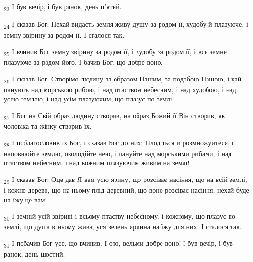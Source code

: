 \begin{tcolorbox}
\textsubscript{23} І був вечір, і був ранок, день п'ятий.
\end{tcolorbox}
\begin{tcolorbox}
\textsubscript{24} І сказав Бог: Нехай видасть земля живу душу за родом її, худобу й плазуюче, і земну звірину за родом її. І сталося так.
\end{tcolorbox}
\begin{tcolorbox}
\textsubscript{25} І вчинив Бог земну звірину за родом її, і худобу за родом її, і все земне плазуюче за родом його. І бачив Бог, що добре воно.
\end{tcolorbox}
\begin{tcolorbox}
\textsubscript{26} І сказав Бог: Створімо людину за образом Нашим, за подобою Нашою, і хай панують над морською рибою, і над птаством небесним, і над худобою, і над усею землею, і над усім плазуючим, що плазує по землі.
\end{tcolorbox}
\begin{tcolorbox}
\textsubscript{27} І Бог на Свій образ людину створив, на образ Божий її Він створив, як чоловіка та жінку створив їх.
\end{tcolorbox}
\begin{tcolorbox}
\textsubscript{28} І поблагословив їх Бог, і сказав Бог до них: Плодіться й розмножуйтеся, і наповнюйте землю, оволодійте нею, і пануйте над морськими рибами, і над птаством небесним, і над кожним плазуючим живим на землі!
\end{tcolorbox}
\begin{tcolorbox}
\textsubscript{29} І сказав Бог: Оце дав Я вам усю ярину, що розсіває насіння, що на всій землі, і кожне дерево, що на ньому плід деревний, що воно розсіває насіння, нехай буде на їжу це вам!
\end{tcolorbox}
\begin{tcolorbox}
\textsubscript{30} І земній усій звірині і всьому птаству небесному, і кожному, що плазує по землі, що душа в ньому жива, уся зелень яринна на їжу для них. І сталося так.
\end{tcolorbox}
\begin{tcolorbox}
\textsubscript{31} І побачив Бог усе, що вчинив. І ото, вельми добре воно! І був вечір, і був ранок, день шостий.
\end{tcolorbox}
